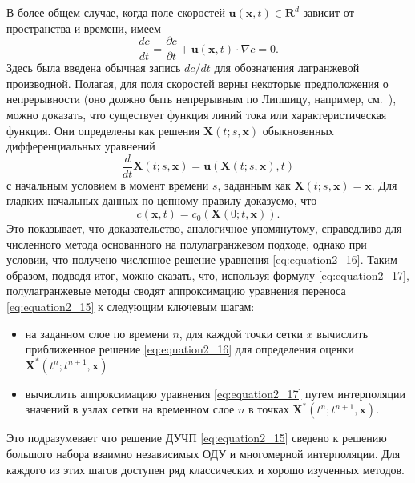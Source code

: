 В более общем случае, когда поле скоростей $\mathbf{u} (\mathbf{x},t)\in\mathbf{R}^d$ зависит от пространства и времени, имеем
%
\begin{equation}
\label{eq:equation2_15}
\frac{dc}{dt}=\frac{\partial{c}}{\partial{t}} + \mathbf{u}(\mathbf{x}, t) \cdot \nabla c = 0.
\end{equation}
%
Здесь была введена обычная запись $dc/dt$ для обозначения лагранжевой производной. Полагая, для поля скоростей верны некоторые предположения о непрерывности (оно должно быть непрерывным по Липшицу, например, см.~\cite{A56}), можно доказать, что существует функция линий тока или характеристическая функция. Они определены как решения $\mathbf{X}(t;s, \mathbf{x})$ обыкновенных дифференциальных уравнений
%
\begin{equation}
\label{eq:equation2_16}
\frac{d}{dt}\mathbf{X}(t;s,\mathbf{x})=\mathbf{u}(\mathbf{X}(t; s, \mathbf{x}), t)
\end{equation}
%
с начальным условием в момент времени $s$, заданным как $\mathbf{X}(t;s,\mathbf{x})=\mathbf{x}$. Для гладких начальных данных по цепному правилу доказуемо, что
%
\begin{equation}
\label{eq:equation2_17}
c(\mathbf{x}, t) = c_0(\mathbf{X}(0;t,\mathbf{x})).
\end{equation}
%
Это показывает, что доказательство, аналогичное упомянутому, справедливо для численного метода основанного на полулагранжевом подходе, однако при условии, что получено численное решение уравнения \eqref{eq:equation2_16}. Таким образом, подводя итог, можно сказать, что, используя формулу \eqref{eq:equation2_17}, полулагранжевые методы сводят аппроксимацию уравнения переноса \eqref{eq:equation2_15} к следующим ключевым шагам:
\begin{itemize}
	\item на заданном слое по времени $n$, для каждой точки сетки $x$ вычислить приближенное решение \eqref{eq:equation2_16} для определения оценки $\mathbf{X}^*(t^n;t^{n+1}, \mathbf{x})$
	\item вычислить аппроксимацию уравнения \eqref{eq:equation2_17} путем интерполяции значений в узлах сетки на временном слое $n$ в точках $\mathbf{X}^*(t^n;t^{n+1}, \mathbf{x})$.
\end{itemize}
Это подразумевает что решение ДУЧП \eqref{eq:equation2_15} сведено к решению большого набора взаимно независимых ОДУ и многомерной интерполяции. Для каждого из этих шагов доступен ряд классических и хорошо изученных методов.
\newpage

